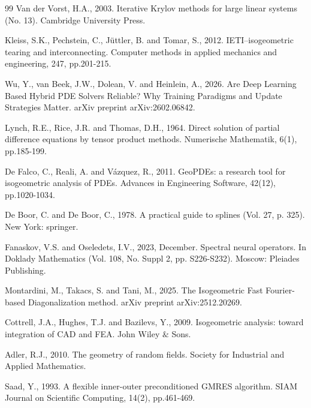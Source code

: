 \documentclass{article}
\theoremstyle{plain}
\numberwithin{equation}{section}
\begin{document}
\begin{thebibliography}{99} 
    Van der Vorst, H.A., 2003. Iterative Krylov methods for large linear systems (No. 13). Cambridge University Press.

    Kleiss, S.K., Pechstein, C., Jüttler, B. and Tomar, S., 2012. IETI–isogeometric tearing and interconnecting. Computer methods in applied mechanics and engineering, 247, pp.201-215.

    Wu, Y., van Beek, J.W., Dolean, V. and Heinlein, A., 2026. Are Deep Learning Based Hybrid PDE Solvers Reliable? Why Training Paradigms and Update Strategies Matter. arXiv preprint arXiv:2602.06842.

    Lynch, R.E., Rice, J.R. and Thomas, D.H., 1964. Direct solution of partial difference equations by tensor product methods. Numerische Mathematik, 6(1), pp.185-199.

    De Falco, C., Reali, A. and Vázquez, R., 2011. GeoPDEs: a research tool for isogeometric analysis of PDEs. Advances in Engineering Software, 42(12), pp.1020-1034.

    De Boor, C. and De Boor, C., 1978. A practical guide to splines (Vol. 27, p. 325). New York: springer.

    Fanaskov, V.S. and Oseledets, I.V., 2023, December. Spectral neural operators. In Doklady Mathematics (Vol. 108, No. Suppl 2, pp. S226-S232). Moscow: Pleiades Publishing.

    Montardini, M., Takacs, S. and Tani, M., 2025. The Isogeometric Fast Fourier-based Diagonalization method. arXiv preprint arXiv:2512.20269.

    Cottrell, J.A., Hughes, T.J. and Bazilevs, Y., 2009. Isogeometric analysis: toward integration of CAD and FEA. John Wiley $\&$ Sons.

    Adler, R.J., 2010. The geometry of random fields. Society for Industrial and Applied Mathematics.

    Saad, Y., 1993. A flexible inner-outer preconditioned GMRES algorithm. SIAM Journal on Scientific Computing, 14(2), pp.461-469.


\end{thebibliography}
\end{document}
